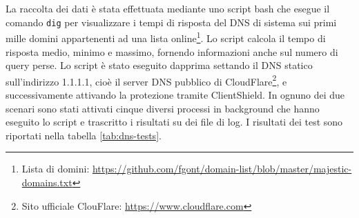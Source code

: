 \documentclass[12pt,a4paper,openright,twoside]{book}
\begin{document}
La raccolta dei dati è stata effettuata mediante uno script bash che esegue il comando \texttt{dig} per visualizzare i tempi di risposta del \gls{DNS} di sistema sui primi mille domini appartenenti ad una lista online\footnote{Lista di domini: \url{https://github.com/fgont/domain-list/blob/master/majestic-domains.txt}}.
Lo script calcola il tempo di risposta medio, minimo e massimo, fornendo informazioni anche sul numero di query perse.
Lo script è stato eseguito dapprima settando il \gls{DNS} statico sull'indirizzo 1.1.1.1, cioè il server \gls{DNS} pubblico di CloudFlare\footnote{Sito ufficiale ClouFlare: \url{https://www.cloudflare.com}}, e successivamente attivando la protezione tramite ClientShield.
In ognuno dei due scenari sono stati attivati cinque diversi processi in background che hanno eseguito lo script e trascritto i risultati su dei file di log.
I risultati dei test sono riportati nella tabella \ref{tab:dns-tests}.
\end{document}
